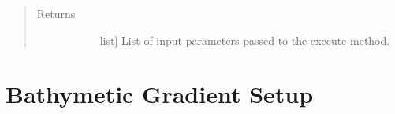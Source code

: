 \documentclass[letterpaper,10pt,english]{sphinxmanual}
\begin{document}
\begin{fulllineitems}
\begin{fulllineitems}
\begin{quote}
\begin{description}
\begin{description}
\end{description}

\item[{Returns}] \leavevmode\begin{description}
\item[{}] \leavevmode{[}list{]}
List of input parameters passed to the execute method.

\end{description}

\end{description}\end{quote}

\end{fulllineitems}


\end{fulllineitems}



\section{Bathymetic Gradient Setup}
\label{\detokenize{StreamStats_DataPrep:bathymetic-gradient-setup}}
\end{document}
